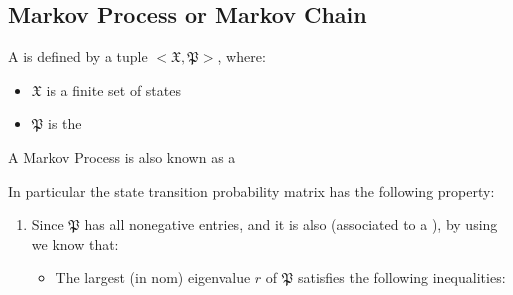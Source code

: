 \subsection{Markov Process or Markov Chain}

A  is defined by a tuple $<\mathfrak{X}, \mathfrak{P}>$, where:
\begin{itemize}
\item $\mathfrak{X}$ is a finite set of states
\item $\mathfrak{P}$ is the 
\end{itemize}
A Markov Process is also known as a 

In particular the state transition probability matrix has the following property:
\begin{enumerate}
\item Since $\mathfrak{P}$ has all nonegative entries, and it is also  (associated to a ), by using  we know that:
\begin{itemize}
\item The largest (in nom) eigenvalue $r$ of $\mathfrak{P}$ satisfies the following inequalities:
\end{itemize}
\end{enumerate}
